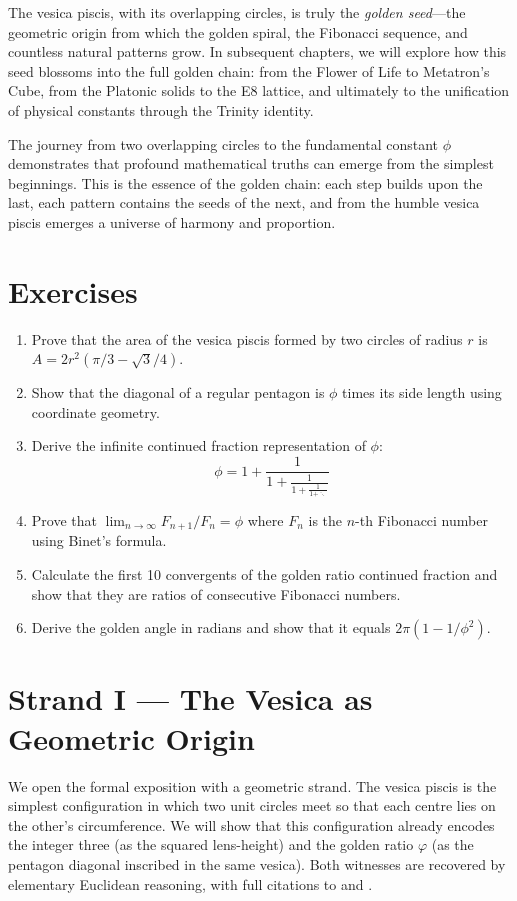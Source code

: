 The vesica piscis, with its overlapping circles, is truly the \emph{golden seed}—the geometric origin from which the golden spiral, the Fibonacci sequence, and countless natural patterns grow. In subsequent chapters, we will explore how this seed blossoms into the full golden chain: from the Flower of Life to Metatron's Cube, from the Platonic solids to the E8 lattice, and ultimately to the unification of physical constants through the Trinity identity.

The journey from two overlapping circles to the fundamental constant $\phi$ demonstrates that profound mathematical truths can emerge from the simplest beginnings. This is the essence of the golden chain: each step builds upon the last, each pattern contains the seeds of the next, and from the humble vesica piscis emerges a universe of harmony and proportion.

\section{Exercises}

\begin{enumerate}
    \item Prove that the area of the vesica piscis formed by two circles of radius $r$ is $A = 2r^2(\pi/3 - \sqrt{3}/4)$.
    \item Show that the diagonal of a regular pentagon is $\phi$ times its side length using coordinate geometry.
    \item Derive the infinite continued fraction representation of $\phi$:
    \[
    \phi = 1 + \frac{1}{1 + \frac{1}{1 + \frac{1}{1 + \ddots}}}
    \]
    \item Prove that $\lim_{n \to \infty} F_{n+1}/F_n = \phi$ where $F_n$ is the $n$-th Fibonacci number using Binet's formula.
    \item Calculate the first 10 convergents of the golden ratio continued fraction and show that they are ratios of consecutive Fibonacci numbers.
    \item Derive the golden angle in radians and show that it equals $2\pi(1 - 1/\phi^2)$.
\end{enumerate}


\section{Strand I --- The Vesica as Geometric Origin}
\label{sec:01-strand-I}

We open the formal exposition with a geometric strand. The vesica
piscis is the simplest configuration in which two unit circles meet so
that each centre lies on the other's circumference. We will show that
this configuration already encodes the integer three (as the squared
lens-height) and the golden ratio $\varphi$ (as the pentagon diagonal
inscribed in the same vesica). Both witnesses are recovered by
elementary Euclidean reasoning, with full citations to
\cite{euclid_elements} and \cite{kepler_harmonices}.

